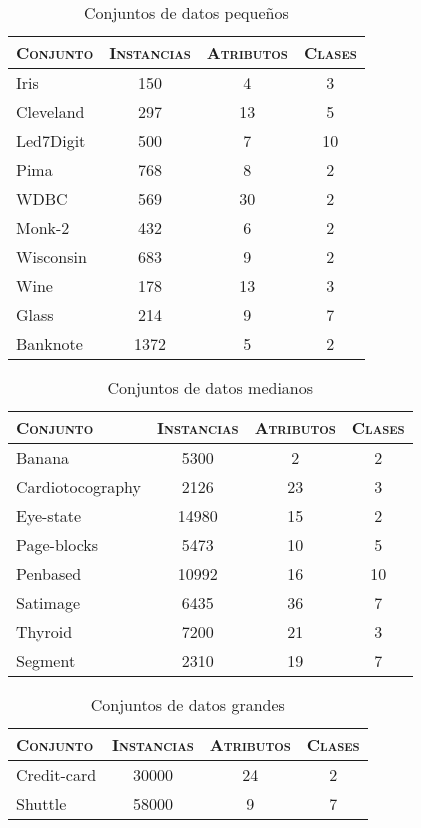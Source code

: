 \begin{table}[]
\centering
\begin{tabular}{l c c c}
\hline
\textsc{Conjunto} & \textsc{Instancias} & \textsc{Atributos} & \textsc{Clases} \\
\hline
\hline

Iris      & 150  &  4 &  3 \\
Cleveland & 297  & 13 &  5 \\
Led7Digit & 500  &  7 & 10 \\
Pima      & 768  &  8 &  2 \\
WDBC      & 569  & 30 &  2 \\
Monk-2    & 432  &  6 &  2 \\
Wisconsin & 683  &  9 &  2 \\
Wine      & 178  & 13 &  3 \\
Glass     & 214  &  9 &  7 \\
Banknote  & 1372 &  5 &  2 \\

\hline
\end{tabular}
\caption{Conjuntos de datos pequeños}
\label{pequenios}
\end{table}

\begin{table}[]
\centering
\begin{tabular}{l c c c}
\hline
\textsc{Conjunto} & \textsc{Instancias} & \textsc{Atributos} & \textsc{Clases} \\
\hline
\hline

Banana           &  5300 &  2 & 2 \\
Cardiotocography &  2126 & 23 & 3 \\
Eye-state        & 14980 & 15 & 2 \\
Page-blocks      &  5473 & 10 & 5 \\
Penbased         & 10992 & 16 & 10 \\
Satimage         &  6435 & 36 & 7 \\
Thyroid          &  7200 & 21 & 3 \\
Segment          &  2310 & 19 & 7 \\

\hline
\end{tabular}
\caption{Conjuntos de datos medianos}
\label{medianos}
\end{table}

\begin{table}[]
\centering
\begin{tabular}{l c c c}
\hline
\textsc{Conjunto} & \textsc{Instancias} & \textsc{Atributos} & \textsc{Clases} \\
\hline
\hline

Credit-card & 30000 & 24 & 2 \\
Shuttle     & 58000 & 9  & 7 \\

\hline
\end{tabular}
\caption{Conjuntos de datos grandes}
\label{grandes}
\end{table}

